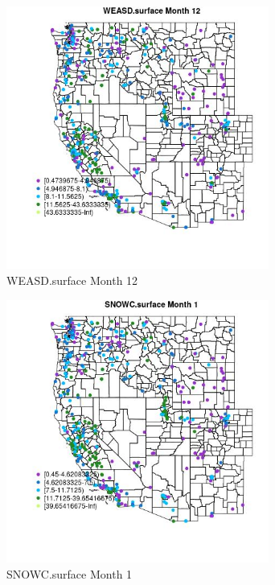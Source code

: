 \begin{figure} 
\centering  
\includegraphics[width=0.77\textwidth]{Code_Outputs/ML_input_report_ML_input_PM25_Step5_part_d_de_duplicated_aves_ML_input_MapObsMo12WEASDsurface.jpg} 
\caption{\label{fig:ML_input_report_ML_input_PM25_Step5_part_d_de_duplicated_aves_ML_inputMapObsMo12WEASDsurface}WEASD.surface Month 12} 
\end{figure} 
 

\begin{figure} 
\centering  
\includegraphics[width=0.77\textwidth]{Code_Outputs/ML_input_report_ML_input_PM25_Step5_part_d_de_duplicated_aves_ML_input_MapObsMo1SNOWCsurface.jpg} 
\caption{\label{fig:ML_input_report_ML_input_PM25_Step5_part_d_de_duplicated_aves_ML_inputMapObsMo1SNOWCsurface}SNOWC.surface Month 1} 
\end{figure} 
 

